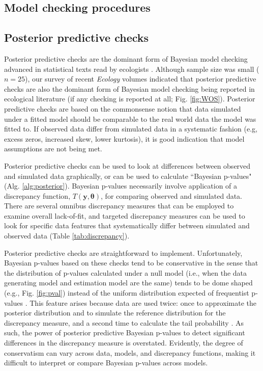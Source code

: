 \documentclass[12pt,english]{article}
\begin{document}
\begin{spacing}{1.9}
\section{Model checking procedures}

\subsection{Posterior predictive checks}

Posterior predictive checks are the dominant form of Bayesian model checking advanced in statistical texts read by ecologists \citep[e.g.,][]{KingEtAl2009,LinkBarker2010,KerySchaub2012,GelmanEtAl2014}. Although sample size was small ($n=25$), our survey of recent \textit{Ecology} volumes indicated that posterior predictive checks are also the dominant form of Bayesian model checking being reported in ecological literature (if any checking is reported at all; Fig. \ref{fig:WOS}).  Posterior predictive checks are based on the commonsense notion that data simulated under a fitted model should be comparable to the real world data the model was fitted to. If observed data differ from simulated data in a systematic fashion (e.g, excess zeros, increased skew, lower kurtosis), it is good indication that model assumptions are not being met.

Posterior predictive checks can be used to look at differences between observed and simulated data graphically, or can be used to calculate ``Bayesian p-values" (Alg. \ref{alg:posterior}).  Bayesian p-values necessarily involve application of a discrepancy function, $T(\textbf{y},\boldsymbol{\theta})$, for comparing observed and simulated data.  There are several omnibus discrepancy measures that can be employed to examine overall lack-of-fit, and targeted discrepancy measures can be used to look for specific data features that systematically differ between simulated and observed data (Table \ref{tab:discrepancy}).

Posterior predictive checks are straightforward to implement.  Unfortunately, Bayesian p-values based on these checks tend to be conservative in the sense that the distribution of p-values calculated under a null model (i.e., when the data generating model and estimation model are the same) tends to be dome shaped (e.g., Fig. \ref{fig:pval}) instead of the uniform distribution expected of frequentist p-values \citep{RobinsEtAl2000}. This feature arises because data are used twice: once to approximate the posterior distribution and to simulate the reference distribution for the discrepancy measure, and a second time to calculate the tail probability  \citep{BayarriBerger2000}.  As such, the power of posterior predictive Bayesian p-values to detect significant differences in the discrepancy measure is overstated.  Evidently, the degree of conservatism can vary across data, models, and discrepancy functions, making it difficult to interpret or compare Bayesian p-values across models.


\end{spacing}
\end{document}
